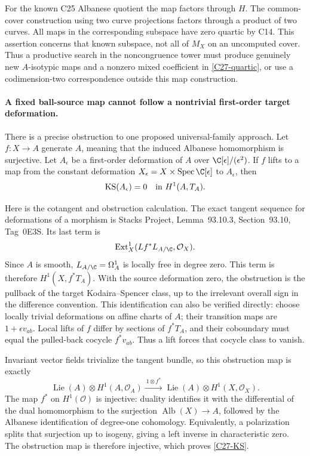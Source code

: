 For the known C25 Albanese quotient the map factors
through $H$.  The common-cover construction using two
curve projections factors through a product of two
curves.  All maps in the corresponding subspace have
zero quartic by C14.  This assertion concerns that
known subspace, not all of $M_X$ on an uncomputed
cover.  Thus a productive search in the noncongruence
tower must produce genuinely new $A$-isotypic maps
and a nonzero mixed coefficient in
\eqref{C27-quartic}, or use a codimension-two
correspondence outside this map construction.

\paragraph{A fixed ball-source map cannot follow a nontrivial first-order target deformation.}
There is a precise obstruction to one proposed
universal-family approach.  Let $f:X\to A$ generate
$A$, meaning that the induced Albanese homomorphism
is surjective.  Let $A_\epsilon$ be a first-order
deformation of $A$ over $\C[\epsilon]/(\epsilon^2)$.
If $f$ lifts to a map from the constant deformation
$X_\epsilon=X\times\operatorname{Spec}\C[\epsilon]$
to $A_\epsilon$, then
\begin{equation}\label{C27-KS}
                  \operatorname{KS}(A_\epsilon)=0
                           \quad\hbox{in }H^1(A,T_A).
\end{equation}

Here is the cotangent and obstruction calculation.
The exact tangent sequence for deformations of a
morphism is Stacks Project, Lemma~93.10.3,
Section~93.10, Tag~0E3S.  Its last term is
\[
 \operatorname{Ext}^1_X(Lf^*L_{A/\C},\mathcal O_X).
\]
Since $A$ is smooth, $L_{A/\C}=\Omega^1_A$ is locally
free in degree zero.  This term is therefore
$H^1(X,f^*T_A)$.  With the source deformation zero,
the obstruction is the pullback of the target
Kodaira--Spencer class, up to the irrelevant overall
sign in the difference convention.  This identification
can also be verified directly: choose locally trivial
deformations on affine charts of $A$; their transition
maps are $1+\epsilon v_{ab}$.  Local lifts of $f$
differ by sections of $f^*T_A$, and their coboundary
must equal the pulled-back cocycle $f^*v_{ab}$.
Thus a lift forces that cocycle class to vanish.

Invariant vector fields trivialize the tangent bundle,
so this obstruction map is exactly
\[
 \operatorname{Lie}(A)\otimes H^1(A,\mathcal O_A)
  \xrightarrow{\ 1\otimes f^*\ }
 \operatorname{Lie}(A)\otimes H^1(X,\mathcal O_X).
\]
The map $f^*$ on $H^1(\mathcal O)$ is injective:
duality identifies it with the differential of the
dual homomorphism to the surjection
$\operatorname{Alb}(X)\to A$, followed by the
Albanese identification of degree-one cohomology.
Equivalently, a polarization splits that surjection
up to isogeny, giving a left inverse in characteristic
zero.  The obstruction map is therefore injective,
which proves \eqref{C27-KS}.

